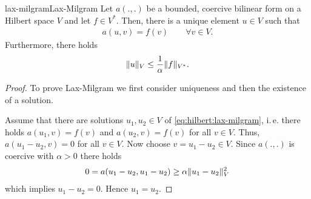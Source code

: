 \begin{Lemma*}{lax-milgram}{Lax-Milgram}
  Let $a(.,.)$ be a bounded, coercive bilinear form on a Hilbert space
  $V$ and let $f \in V^*$. Then, there is a unique element $u\in V$
  such that
  \begin{gather}
    \label{eq:hilbert:lax-milgram}
    a(u,v) = f(v) \qquad\forall v\in V.
  \end{gather}
  Furthermore, there holds
  \begin{gather}
    \label{eq:hilbert:lax-milgram-estimate}
    \lVert u\rVert_V \le \frac1\alpha \lVert f\rVert_{V^*}.
  \end{gather}
\end{Lemma*}

\begin{proof}
  To prove Lax-Milgram we first consider uniqueness and then the
  existence of a solution.

  Assume that there are solutions $u_1, u_2\in V$ of \eqref{eq:hilbert:lax-milgram},
  i.\,e. there holds $a(u_1,v)=f(v)$ and $a(u_2,v)=f(v)$ for all $v\in V$.
  Thus, $a(u_1-u_2,v)=0$ for all $v\in V$.
  Now choose $v=u_1-u_2\in V$.
  Since $a(.,.)$ is coercive with $\alpha>0$ there holds
  \begin{gather*}
    0 = a(u_1-u_2,u_1-u_2)\geq \alpha \lVert u_1-u_2\rVert_{V}^2 
  \end{gather*}
  which implies $u_1-u_2=0$. Hence $u_1=u_2$.


\end{proof}
